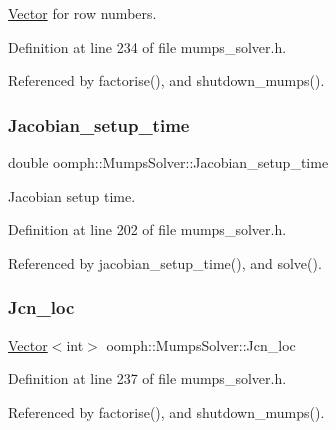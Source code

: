 \hyperlink{classoomph_1_1Vector}{Vector} for row numbers. 



Definition at line 234 of file mumps\+\_\+solver.\+h.



Referenced by factorise(), and shutdown\+\_\+mumps().

\mbox{\label{classoomph_1_1MumpsSolver_a0608ee6d4a166c35a5d2d3756f119780}} 
\subsubsection{\texorpdfstring{Jacobian\+\_\+setup\+\_\+time}{Jacobian\_setup\_time}}
{\footnotesize\ttfamily double oomph\+::\+Mumps\+Solver\+::\+Jacobian\+\_\+setup\+\_\+time\hspace{0.3cm}{\ttfamily [private]}}



Jacobian setup time. 



Definition at line 202 of file mumps\+\_\+solver.\+h.



Referenced by jacobian\+\_\+setup\+\_\+time(), and solve().

\mbox{\label{classoomph_1_1MumpsSolver_a593d7783708440445e09b6d595168cce}} 
\subsubsection{\texorpdfstring{Jcn\+\_\+loc}{Jcn\_loc}}
{\footnotesize\ttfamily \hyperlink{classoomph_1_1Vector}{Vector}$<$int$>$ oomph\+::\+Mumps\+Solver\+::\+Jcn\+\_\+loc\hspace{0.3cm}{\ttfamily [private]}}



Definition at line 237 of file mumps\+\_\+solver.\+h.



Referenced by factorise(), and shutdown\+\_\+mumps().

